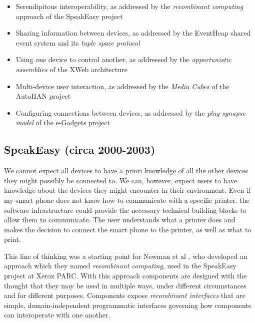 \begin{itemize}
	\item Serendipitous interoperability, as addressed by the \emph{recombinant computing} approach of the SpeakEasy project
	\item Sharing information between devices, as addressed by the Event\-Heap shared event system and its \emph{tuple space protocol}
	\item Using one device to control another, as addressed by the \emph{opportunistic assemblies} of the XWeb architecture
	\item Multi-device user interaction, as addressed by the \emph{Media Cubes} of the AutoHAN project
	\item Configuring connections between devices, as addressed by the \emph{plug-synapse model} of the e-Gadgets project
\end{itemize}



\subsection{SpeakEasy (circa 2000-2003)}

We cannot expect all devices to have a priori knowledge of all the other devices they might possibly be connected to. We can, however, expect users to have knowledge about the devices they might encounter in their environment. Even if my smart phone does not know how to communicate with a specific printer, the software infrastructure could provide the necessary technical building blocks to allow them to communicate. The user understands what a printer does and makes the decision to connect the smart phone to the printer, as well as what to print.


This line of thinking was a starting point for Newman et al \cite{Newman2002}, who developed an approach which they named \emph{recombinant computing}, used in the SpeakEasy project at Xerox PARC. With this approach components are designed with the thought that they may be used in multiple ways, under different circumstances and for different purposes. Components expose \emph{recombinant interfaces} that are simple, domain-independent programmatic interfaces governing how components can interoperate with one another.

